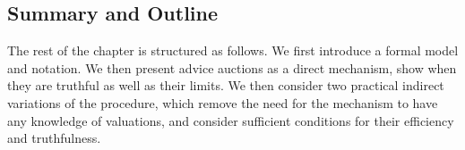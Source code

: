 








\subsection{Summary and Outline}


The rest of the chapter is structured as follows.
We first introduce a formal model and notation.
We then present advice auctions as a direct mechanism, show when they are truthful as well as their limits.
We then consider two practical indirect variations of the procedure, which remove the need for the mechanism to have any knowledge of valuations, and consider sufficient conditions for their efficiency and truthfulness.  




